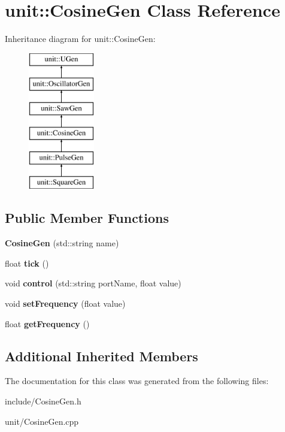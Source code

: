 \hypertarget{classunit_1_1CosineGen}{}\section{unit\+:\+:Cosine\+Gen Class Reference}
\label{classunit_1_1CosineGen}
Inheritance diagram for unit\+:\+:Cosine\+Gen\+:\begin{figure}[H]
\begin{center}
\leavevmode
\includegraphics[height=6.000000cm]{classunit_1_1CosineGen}
\end{center}
\end{figure}
\subsection*{Public Member Functions}
\begin{DoxyCompactItemize}
\item 
{\bfseries Cosine\+Gen} (std\+::string name)\hypertarget{classunit_1_1CosineGen_a1eb4aa0471f337e95653d91e550f58cb}{}\label{classunit_1_1CosineGen_a1eb4aa0471f337e95653d91e550f58cb}

\item 
float {\bfseries tick} ()\hypertarget{classunit_1_1CosineGen_a4c1ceffaf70b5eae5c4153ee4b93c001}{}\label{classunit_1_1CosineGen_a4c1ceffaf70b5eae5c4153ee4b93c001}

\item 
void {\bfseries control} (std\+::string port\+Name, float value)\hypertarget{classunit_1_1CosineGen_a15411f97b09516de2bf85327615f1784}{}\label{classunit_1_1CosineGen_a15411f97b09516de2bf85327615f1784}

\item 
void {\bfseries set\+Frequency} (float value)\hypertarget{classunit_1_1CosineGen_aebdf5bbd7a0614f3a3cd2ae0d8602b32}{}\label{classunit_1_1CosineGen_aebdf5bbd7a0614f3a3cd2ae0d8602b32}

\item 
float {\bfseries get\+Frequency} ()\hypertarget{classunit_1_1CosineGen_a2865a158e86e8e85ac2c4d686de65fce}{}\label{classunit_1_1CosineGen_a2865a158e86e8e85ac2c4d686de65fce}

\end{DoxyCompactItemize}
\subsection*{Additional Inherited Members}


The documentation for this class was generated from the following files\+:\begin{DoxyCompactItemize}
\item 
include/Cosine\+Gen.\+h\item 
unit/Cosine\+Gen.\+cpp\end{DoxyCompactItemize}
